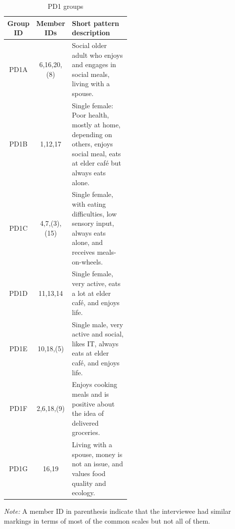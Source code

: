 \begin{table}[!b]%
\caption{PD1 groups}
\label{tab:pdgroups}
\begin{minipage}{\columnwidth}
\begin{center}
\begin{tabular}{ccp{0.5\linewidth}}
Group ID & Member IDs & Short pattern description\\\toprule
PD1A & 6,16,20,(8) & Social older adult who enjoys and engages in social meals, living with a spouse.\\
PD1B & 1,12,17 & Single female: Poor health, mostly at home, depending on others, enjoys social meal, eats at elder caf\'e but always eats alone.\\
PD1C & 4,7,(3),(15) & Single female, with eating difficulties, low sensory input, always eats alone, and receives meals-on-wheels.\\
PD1D & 11,13,14 & Single female, very active, eats a lot at elder caf\'e, and enjoys life.\\
PD1E & 10,18,(5) & Single male, very active and social, likes IT, always eats at elder caf\'e, and enjoys life.\\
PD1F & 2,6,18,(9) & Enjoys cooking meals and is positive about the idea of delivered groceries.\\
PD1G & 16,19 & Living with a spouse, money is not an issue, and values food quality and ecology.\\
\bottomrule
\end{tabular}
\end{center}
\bigskip\centering
\footnotesize
\emph{Note:} A member ID in parenthesis indicate that the interviewee had similar markings in terms of most of the common scales but not all of them.
\end{minipage}
\end{table}%

